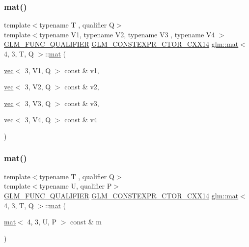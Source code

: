 \subsubsection{\texorpdfstring{mat()}{mat()}\hspace{0.1cm}{\footnotesize\ttfamily [20/21]}}
{\footnotesize\ttfamily template$<$typename T , qualifier Q$>$ \\
template$<$typename V1, typename V2, typename V3 , typename V4 $>$ \\
\hyperlink{setup_8hpp_a33fdea6f91c5f834105f7415e2a64407}{G\+L\+M\+\_\+\+F\+U\+N\+C\+\_\+\+Q\+U\+A\+L\+I\+F\+I\+ER} \hyperlink{setup_8hpp_a0900f9145e68bf6061b6f5e7be3fa751}{G\+L\+M\+\_\+\+C\+O\+N\+S\+T\+E\+X\+P\+R\+\_\+\+C\+T\+O\+R\+\_\+\+C\+X\+X14} \hyperlink{structglm_1_1mat}{glm\+::mat}$<$ 4, 3, T, Q $>$\+::\hyperlink{structglm_1_1mat}{mat} (\begin{DoxyParamCaption}\item[{\hyperlink{structglm_1_1vec}{vec}$<$ 3, V1, Q $>$ const \&}]{v1,  }\item[{\hyperlink{structglm_1_1vec}{vec}$<$ 3, V2, Q $>$ const \&}]{v2,  }\item[{\hyperlink{structglm_1_1vec}{vec}$<$ 3, V3, Q $>$ const \&}]{v3,  }\item[{\hyperlink{structglm_1_1vec}{vec}$<$ 3, V4, Q $>$ const \&}]{v4 }\end{DoxyParamCaption})}

\mbox{\label{structglm_1_1mat_3_014_00_013_00_01_t_00_01_q_01_4_a8227f64e941f2a66f0ac66efde15e224}} 
\subsubsection{\texorpdfstring{mat()}{mat()}\hspace{0.1cm}{\footnotesize\ttfamily [21/21]}}
{\footnotesize\ttfamily template$<$typename T , qualifier Q$>$ \\
template$<$typename U, qualifier P$>$ \\
\hyperlink{setup_8hpp_a33fdea6f91c5f834105f7415e2a64407}{G\+L\+M\+\_\+\+F\+U\+N\+C\+\_\+\+Q\+U\+A\+L\+I\+F\+I\+ER} \hyperlink{setup_8hpp_a0900f9145e68bf6061b6f5e7be3fa751}{G\+L\+M\+\_\+\+C\+O\+N\+S\+T\+E\+X\+P\+R\+\_\+\+C\+T\+O\+R\+\_\+\+C\+X\+X14} \hyperlink{structglm_1_1mat}{glm\+::mat}$<$ 4, 3, T, Q $>$\+::\hyperlink{structglm_1_1mat}{mat} (\begin{DoxyParamCaption}\item[{\hyperlink{structglm_1_1mat}{mat}$<$ 4, 3, U, P $>$ const \&}]{m }\end{DoxyParamCaption})}



